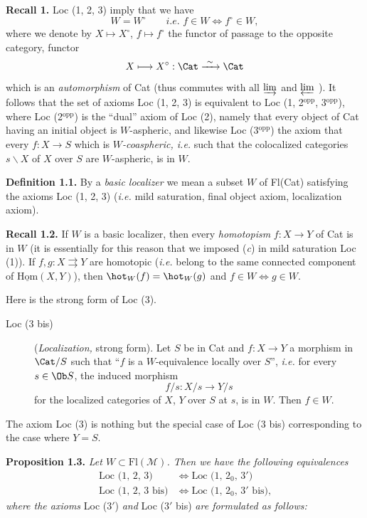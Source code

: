 \textbf{Recall 1.} Loc (1, 2, 3) imply that we have
\[
W = W^\circ \qquad \textit{i.e. } f \in W \iff f^\circ \in W,
\]
where we denote by $X \longmapsto X^\circ$, $f \longmapsto f^\circ$ the functor of passage to the opposite category, functor
\[
X \longmapsto X^\circ : \Cat \xrightarrow{\ \sim\ } \Cat
\]
which is an \textit{automorphism} of Cat (thus commutes with all $\varinjlim$ and $\varprojlim$ ). It follows that the set of axioms Loc (1, 2, 3) is equivalent to Loc (1, 2$^{\mathrm{opp}}$, 3$^{\mathrm{opp}}$), where Loc (2$^{\mathrm{opp}}$) is the ``dual'' axiom of Loc (2), namely that every object of Cat having an initial object is $W$-aspheric, and likewise Loc (3$^{\mathrm{opp}}$) the axiom that every $f : X \longrightarrow S$ which is $W$\textit{-coaspheric, i.e.} such that the colocalized categories $s\backslash X$ of $X$ over $S$ are $W$-aspheric, is in $W$.

\textbf{Definition 1.1.} By a \textit{basic localizer} we mean a subset $W$ of Fl(Cat) satisfying the axioms Loc (1, 2, 3) (\textit{i.e.} mild saturation, final object axiom, localization axiom).


\textbf{Recall 1.2.} If $W$ is a basic localizer, then every \textit{homotopism} $f : X \longrightarrow Y$ of Cat is in $W$ (it is essentially for this reason that we imposed (\textit{c}) in mild saturation Loc (1)). If $f, g : X \rightrightarrows Y$ are homotopic (\textit{i.e.} belong to the same connected component of $\underline{\mathrm{Hom}}(X, Y)$), then $\hot_W(f) = \hot_W(g)$ and $f \in W \iff g \in W$.

Here is the strong form of Loc (3).

\begin{description}
\item[Loc (3 bis)] (\textit{Localization,} strong form). Let $S$ be in Cat and $f : X \longrightarrow Y$ a morphism in $\Cat/S$ such that ``$f$ is a $W$-equivalence locally over $S$'', \textit{i.e.} for every $s \in \Ob S$, the induced morphism
\[
f/s : X/s \longrightarrow Y/s
\]
for the localized categories of $X$, $Y$ over $S$ at $s$, is in $W$. Then $f \in W$.
\end{description}

The axiom Loc (3) is nothing but the special case of Loc (3 bis) corresponding to the case where $Y = S$.

\textbf{Proposition 1.3.} \textit{Let $W \subset \mathrm{Fl}(\mathcal{M})$. Then we have the following equivalences}
\[
\begin{aligned}
\text{Loc (1, 2, 3)} &\iff \text{Loc (1, $2_0$, $3'$)}\\
\text{Loc (1, 2, 3 bis)} &\iff \text{Loc (1, $2_0$, $3'$ bis),}
\end{aligned}
\]
\textit{where the axioms} Loc ($3'$) \textit{and} Loc ($3'$ bis) \textit{are formulated as follows:}

